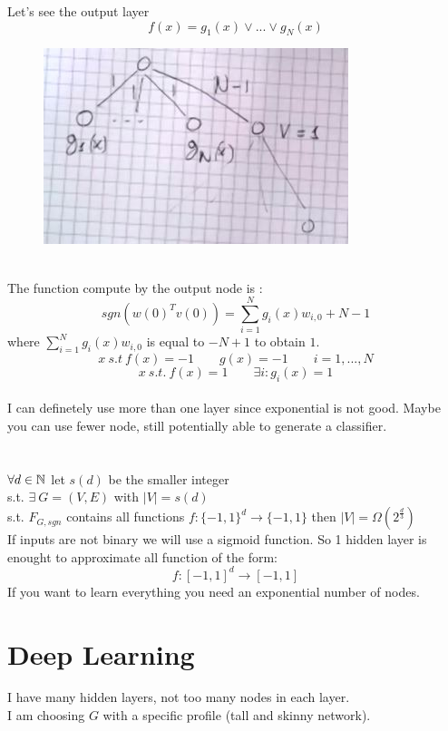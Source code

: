 \documentclass[../main.tex]{subfiles}
\begin{document}
\newpage
Let's see the output layer
$$
f(x) = g_1(x) \vee ... \vee g_N(x)
$$
\begin{figure}[h]
    \centering
    \includegraphics[width=0.4\linewidth]{../img/lez24-img13.JPG}
    \caption{}
\end{figure}\\
The function compute by the output node is :
$$
sgn(w(0)^T v(0)) = \sum_{i=1}^N g_i(x) w_{i,0}  + N -1
$$
where $\sum_{i=1}^N g_i(x) w_{i,0}$ is equal to $-N +1$ to obtain $1$.
$$
x \ s.t \ f(x) = -1 \qquad g(x) = -1 \qquad i = 1,...,N
$$
$$
x \ s.t. \ f(x) = 1 \qquad \exists i : g_i(x) = 1
$$\\
I can definetely use more than one layer since exponential is not good. Maybe you can use fewer node, still potentially able to generate a classifier.
\\\\
\\
$
\forall d \in \mathbb{N}
$ let $s(d)$ be the smaller integer \\ s.t. $\exists \ G = (V,E)$ with $|V| = s(d)$ \\ s.t. $F_{G,sgn}$ contains all functions $f: \{-1,1\}^d \rightarrow \{-1,1\}$ then $|V|= \Omega (2^{\frac{d}{3}})$
\\
If inputs are not binary we will use a sigmoid function. So 1 hidden layer is enought to approximate all function of the form:
$$
f: [-1,1]^d \rightarrow [-1,1]
$$
If you want to learn everything you need an exponential number of nodes.

\newpage
\section{Deep Learning}
I have many hidden layers, not too many nodes in each layer. 
\\
I am choosing $G$ with a specific profile (tall and skinny network).
\end{document}
